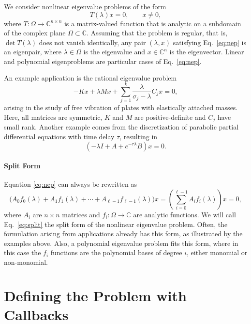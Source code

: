We consider nonlinear eigenvalue problems of the form
\begin{equation}
T(\lambda)x=0,\qquad x\neq 0,\label{eq:nep}
\end{equation}
where $T:\Omega\rightarrow\mathbb{C}^{n\times n}$ is a matrix-valued function that is analytic on a subdomain of the complex plane $\Omega\subset\mathbb{C}$. Assuming that the problem is regular, that is, $\det T(\lambda)$ does not vanish identically, any pair $(\lambda,x)$ satisfying Eq.\ \ref{eq:nep} is an eigenpair, where $\lambda\in\Omega$ is the eigenvalue and $x\in\mathbb{C}^n$ is the eigenvector. Linear and polynomial eigenproblems are particular cases of Eq.\ \ref{eq:nep}.

An example application is the rational eigenvalue problem
\begin{equation}
-Kx+\lambda Mx+\sum_{j=1}^k\frac{\lambda}{\sigma_j-\lambda}C_jx=0,\label{eq:rep}
\end{equation}
arising in the study of free vibration of plates with elastically attached masses. Here, all matrices are symmetric, $K$ and $M$ are positive-definite and $C_j$ have small rank.
Another example comes from the discretization of parabolic partial differential equations with time delay $\tau$, resulting in
\begin{equation}
(-\lambda I + A + e^{-\tau\lambda}B)x = 0.\label{eq:delay}
\end{equation}

\paragraph{Split Form}
Equation \ref{eq:nep} can always be rewritten as
\begin{equation}
\big(A_0f_0(\lambda)+A_1f_1(\lambda)+\cdots+A_{\ell-1}f_{\ell-1}(\lambda)\big)x=
\left(\sum_{i=0}^{\ell-1}A_if_i(\lambda)\right)x = 0,\label{eq:split}
\end{equation}
where $A_i$ are $n\times n$ matrices and $f_i:\Omega\rightarrow\mathbb{C}$ are analytic functions. We will call Eq.\ \ref{eq:split} the split form of the nonlinear eigenvalue problem. Often, the formulation arising from applications already has this form, as illustrated by the examples above. Also, a polynomial eigenvalue problem fits this form, where in this case the $f_i$ functions are the polynomial bases of degree $i$, either monomial or non-monomial.

\section{\label{sec:nepjac}Defining the Problem with Callbacks}


